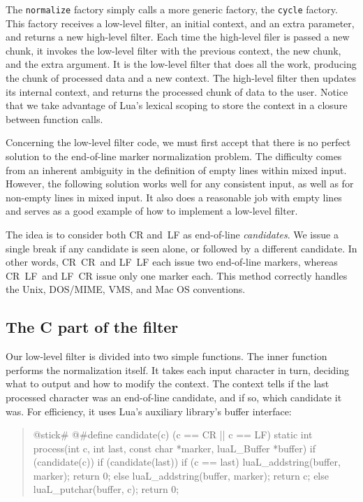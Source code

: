 \documentclass[10pt]{article}
\begin{document}
The \texttt{normalize} factory simply calls a more generic
factory, the \texttt{cycle} factory. This factory receives a
low-level filter, an initial context, and an extra
parameter, and returns a new high-level filter.  Each time
the high-level filer is passed a new chunk, it invokes the
low-level filter with the previous context, the new chunk,
and the extra argument.  It is the low-level filter that
does all the work, producing the chunk of processed data and
a new context. The high-level filter then updates its
internal context, and returns the processed chunk of data to
the user.  Notice that we take advantage of Lua's lexical
scoping to store the context in a closure between function
calls.  

Concerning the low-level filter code, we must first accept
that there is no perfect solution to the end-of-line marker
normalization problem. The difficulty comes from an
inherent ambiguity in the definition of empty lines within
mixed input. However, the following solution works well for
any consistent input, as well as for non-empty lines in
mixed input. It also does a reasonable job with empty lines
and serves as a good example of how to implement a low-level
filter.

The idea is to consider both CR and~LF as end-of-line
\emph{candidates}.  We issue a single break if any candidate
is seen alone, or followed by a different candidate.  In
other words, CR~CR~and LF~LF each issue two end-of-line
markers, whereas CR~LF~and LF~CR issue only one marker each.
This method correctly handles the Unix, DOS/MIME, VMS, and Mac
OS conventions.

\subsection{The C part of the filter}

Our low-level filter is divided into two simple functions.
The inner function performs the normalization itself. It takes
each input character in turn, deciding what to output and
how to modify the context. The context tells if the last
processed character was an end-of-line candidate, and if so, 
which candidate it was. For efficiency, it uses 
Lua's auxiliary library's buffer interface: 
\begin{quote}
\begin{C}
@stick#
@#define candidate(c) (c == CR || c == LF)
static int process(int c, int last, const char *marker, 
    luaL_Buffer *buffer) {
  if (candidate(c)) {
    if (candidate(last)) {
      if (c == last) luaL_addstring(buffer, marker);
      return 0;
    } else {
      luaL_addstring(buffer, marker);
      return c;
    }
  } else {
    luaL_putchar(buffer, c);
    return 0;
  }
}
%
\end{C}
\end{quote}
\end{document}
